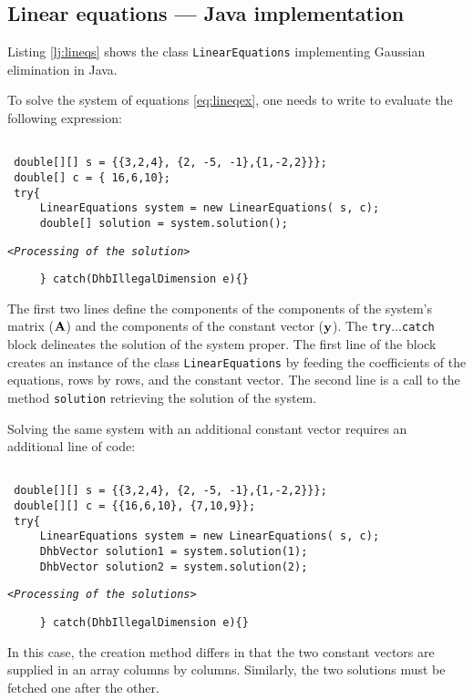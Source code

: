 \documentclass[twoside]{book}
\begin{document}
\subsection{Linear equations --- Java implementation}
Listing \ref{lj:lineqs} shows the class {\tt LinearEquations}
implementing Gaussian elimination in Java.

To solve the system of equations \ref{eq:lineqex}, one needs to
write to evaluate the following expression:
\begin{codeExample}
\begin{verbatim}

 double[][] s = {{3,2,4}, {2, -5, -1},{1,-2,2}}};
 double[] c = { 16,6,10};
 try{
     LinearEquations system = new LinearEquations( s, c);
     double[] solution = system.solution();
\end{verbatim}
\hfil{\tt<\sl Processing of the solution\tt>}\hfil
\begin{verbatim}
     } catch(DhbIllegalDimension e){}
\end{verbatim}
\end{codeExample}
The first two lines define the components of the components of the
system's matrix (${\bf A}$) and the components of the constant
vector (${\bf y}$). The {\tt try$\ldots$catch} block delineates
the solution of the system proper. The first line of the block
creates an instance of the class {\tt LinearEquations} by feeding
the coefficients of the equations, rows by rows, and the constant
vector. The second line is a call to the method {\tt solution}
retrieving the solution of the system.

Solving the same system with an additional constant vector
requires an additional line of code:
\begin{codeExample}
\begin{verbatim}

 double[][] s = {{3,2,4}, {2, -5, -1},{1,-2,2}}};
 double[][] c = {{16,6,10}, {7,10,9}};
 try{
     LinearEquations system = new LinearEquations( s, c);
     DhbVector solution1 = system.solution(1);
     DhbVector solution2 = system.solution(2);
\end{verbatim}
\hfil{\tt<\sl Processing of the solutions\tt>}\hfil
\begin{verbatim}
     } catch(DhbIllegalDimension e){}
\end{verbatim}
\end{codeExample}
In this case, the creation method differs in that the two constant
vectors are supplied in an array columns by columns. Similarly,
the two solutions must be fetched one after the other.
\end{document}
